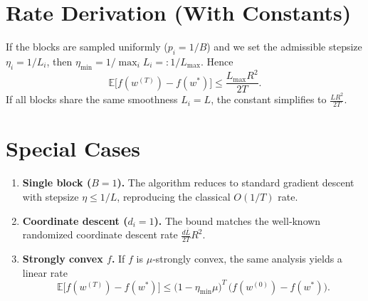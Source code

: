\documentclass{article}
\newcommand{\E}{\mathbb{E}}
\begin{document}
\section*{Rate Derivation (With Constants)}
If the blocks are sampled uniformly ($p_i=1/B$) and we set the admissible
stepsize $\eta_i=1/L_i$, then $\eta_{\min}=1/\max_i L_i=:1/L_{\max}$.  Hence
\[
\E\!\big[f(w^{(T)})-f(w^{*})\big]
\le \frac{L_{\max}R^{2}}{2T}.
\]
If all blocks share the same smoothness $L_i=L$, the constant simplifies to
$\frac{L R^{2}}{2T}$.

\section*{Special Cases}
\begin{enumerate}[label=(\alph*)]
\item \textbf{Single block ($B=1$).} The algorithm reduces to standard gradient
descent with stepsize $\eta\le1/L$, reproducing the classical $O(1/T)$ rate.
\item \textbf{Coordinate descent ($d_i=1$).} The bound matches the well‑known
randomized coordinate descent rate $\frac{d\bar L}{2T}R^{2}$.
\item \textbf{Strongly convex $f$.} If $f$ is $\mu$‑strongly convex, the same
analysis yields a linear rate
\[
\E\!\big[f(w^{(T)})-f(w^{*})\big]\le
\big(1-\eta_{\min}\mu\big)^{T}\, \big(f(w^{(0)})-f(w^{*})\big).
\]
\end{enumerate}
\end{document}
